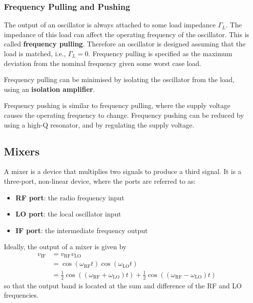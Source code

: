 \documentclass{article}
\begin{document}
\subsubsection{Frequency Pulling and Pushing}
The output of an oscillator is always attached to some load impedance
\(\Gamma_L\). The impedance of this load can affect the operating
frequency of the oscillator. This is called \textbf{frequency pulling}.
Therefore an oscillator is designed assuming that the load is matched,
i.e., \(\Gamma_L = 0\). Frequency pulling is specified as the maximum
deviation from the nominal frequency given some worst case load.

Frequency pulling can be minimised by isolating the oscillator from the
load, using an \textbf{isolation amplifier}.

Frequency pushing is similar to frequency pulling, where the supply
voltage causes the operating frequency to change. Frequency pushing can
be reduced by using a high-Q resonator, and by regulating the supply
voltage.
\subsection{Mixers}
A mixer is a device that multiplies two signals to produce a third
signal. It is a three-port, non-linear device, where the ports are
referred to as:
\begin{itemize}
    \item \textbf{RF port}: the radio frequency input
    \item \textbf{LO port}: the local oscillator input
    \item \textbf{IF port}: the intermediate frequency output
\end{itemize}
Ideally, the output of a mixer is given by
\begin{align*}
    v_{\mathrm{IF}} & = v_{\mathrm{RF}} v_{\mathrm{LO}}                                                                                                                                                               \\
                    & = \cos{\left( \omega_{\mathrm{RF}} t \right)} \cos{\left( \omega_{\mathrm{LO}} t \right)}                                                                                                       \\
                    & = \frac{1}{2} \cos{\left( \left( \omega_{\mathrm{RF}} + \omega_{\mathrm{LO}} \right) t \right)} + \frac{1}{2} \cos{\left( \left( \omega_{\mathrm{RF}} - \omega_{\mathrm{LO}} \right) t \right)}
\end{align*}
so that the output band is located at the sum and difference of the
RF and LO frequencies.
\end{document}
